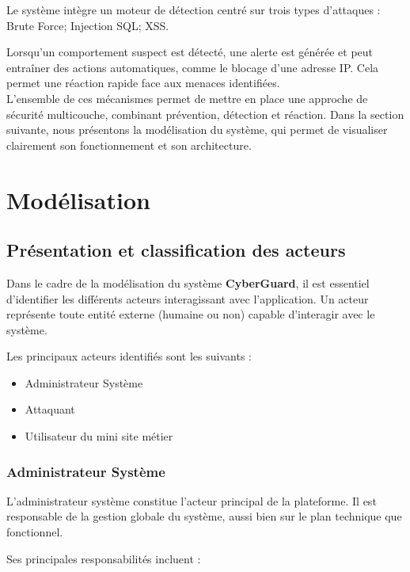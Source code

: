 \documentclass[a4paper,12pt]{report}
\begin{document}
    Le système intègre un moteur de détection centré sur trois types d’attaques : Brute Force; Injection SQL; XSS.
    
    Lorsqu’un comportement suspect est détecté, une alerte est générée et peut entraîner des actions automatiques, comme le blocage d’une adresse IP. Cela permet une réaction rapide face aux menaces identifiées.\\
    
    L’ensemble de ces mécanismes permet de mettre en place une approche de sécurité multicouche, combinant prévention, détection et réaction. Dans la section suivante, nous présentons la modélisation du système, qui permet de visualiser clairement son fonctionnement et son architecture.
     
    \section{Modélisation}
    
    \subsection{Présentation et classification des acteurs}
    
    Dans le cadre de la modélisation du système \textbf{CyberGuard}, il est essentiel d’identifier les différents acteurs interagissant avec l’application. Un acteur représente toute entité externe (humaine ou non) capable d’interagir avec le système.
    
    Les principaux acteurs identifiés sont les suivants :
    
    \begin{itemize}
        \item Administrateur Système
        \item Attaquant
        \item Utilisateur du mini site métier
    \end{itemize}
    
    \subsubsection{Administrateur Système}
    
    L’administrateur système constitue l’acteur principal de la plateforme. Il est responsable de la gestion globale du système, aussi bien sur le plan technique que fonctionnel.
    
    Ses principales responsabilités incluent :
    
\end{document}
